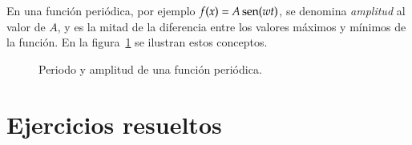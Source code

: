En una función periódica, por ejemplo $f(x)=A\operatorname{sen}(wt)$, se denomina \emph{amplitud} al valor de $A$, y es la mitad de la diferencia entre los valores máximos y mínimos de la función. En la figura~\ref{g:periodoyamplitud} se ilustran estos conceptos.

\begin{figure}[h!]
\centering
\scalebox{0.8}{}
\caption{Periodo y amplitud de una función periódica.}
\label{g:periodoyamplitud}
\end{figure}

\clearpage
\newpage

\section{Ejercicios resueltos}

